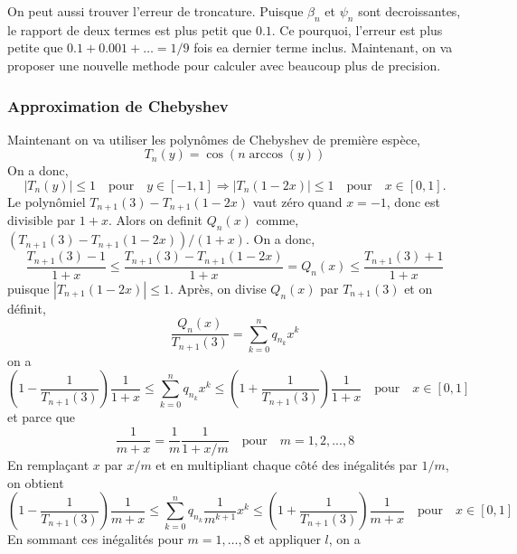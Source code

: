 On peut aussi trouver l'erreur de troncature. Puisque $\beta_{n}$ et $\psi_{n}$
sont decroissantes, le rapport de deux termes est plus petit que $0.1$. Ce
pourquoi, l'erreur est plus petite que $0.1 + 0.001 + \ldots = 1/9$ fois ea
dernier terme inclus. Maintenant, on va proposer une nouvelle methode pour
calculer avec beaucoup plus de precision.

\subsubsection{Approximation de Chebyshev}
\noindent Maintenant on va utiliser les polyn\^{o}mes de Chebyshev de premi\`ere
esp\`ece,
\[
	T_{n}(y) = \cos(n \arccos(y))
\]
On a donc,
\[
	|T_{n}(y)| \le 1 \quad \text{pour} \quad y\in [-1, 1] \Rightarrow
	|T_{n}(1-2x)| \le 1 \quad \text{pour} \quad x\in [0, 1].
\]
Le polyn\^{o}miel $T_{n+1}(3) - T_{n+1}(1-2x)$ vaut z\'ero quand $x=-1$, donc
est divisible par $1+x$. Alors on definit $Q_{n}(x)$ comme, $(T_{n+1}(3) -
T_{n+1}(1-2x))/(1+x)$. On a donc,
\[
	\frac{T_{n+1}(3)-1}{1+x} \le \frac{T_{n+1}(3) - T_{n+1}(1-2x)}{1+x} =
	Q_{n}(x) \le \frac{T_{n+1}(3)+1}{1+x}
\]
puisque $|T_{n+1}(1-2x)| \le 1$. Apr\`es, on divise $Q_{n}(x)$ par
$T_{n+1}(3)$ et on d\'efinit,
\[
	\frac{Q_{n}(x)}{T_{n+1}(3)} = \sum_{k=0}^{n} q_{n_{k}} x^{k}
\]
on a
\[
	\left( 1-\frac{1}{T_{n+1}(3)} \right)\frac{1}{1+x} \le
	\sum_{k=0}^{n}q_{n_{k}}x^{k} \le \left(
	1+\frac{1}{T_{n+1}(3)}\right)\frac{1}{1+x} \quad \text{pour} \quad x\in [0,1]
\]
et parce que
\[
	\frac{1}{m+x} = \frac{1}{m}\frac{1}{1+x/m} \quad \text{pour} \quad m=1,2,...,8
\]
En remplaçant $x$ par $x/m$ et en multipliant chaque côté des inégalités
par $1/m$, on obtient
\[
	\left( 1-\frac{1}{T_{n+1}(3)} \right)\frac{1}{m+x} \le
	\sum_{k=0}^{n}q_{n_{k}}\frac{1}{m^{k+1}}x^{k} \le \left(
	1+\frac{1}{T_{n+1}(3)}\right)\frac{1}{m+x} \quad \text{pour} \quad x\in
	[0,1]
\]
En sommant ces in\'egalit\'es pour $m=1, \ldots, 8$ et appliquer $l$, on a


